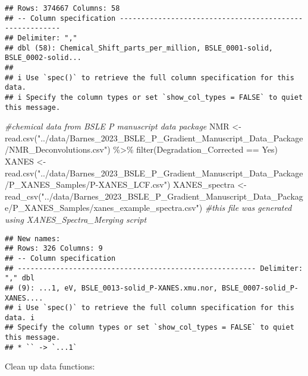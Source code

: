 \documentclass[
]{article}
\newenvironment{Shaded}{\begin{snugshade}}{\end{snugshade}}
\newcommand{\CommentTok}[1]{\textcolor[rgb]{0.56,0.35,0.01}{\textit{#1}}}
\newcommand{\FunctionTok}[1]{\textcolor[rgb]{0.00,0.00,0.00}{#1}}
\newcommand{\NormalTok}[1]{#1}
\newcommand{\OtherTok}[1]{\textcolor[rgb]{0.56,0.35,0.01}{#1}}
\newcommand{\SpecialCharTok}[1]{\textcolor[rgb]{0.00,0.00,0.00}{#1}}
\newcommand{\StringTok}[1]{\textcolor[rgb]{0.31,0.60,0.02}{#1}}
\begin{document}
\begin{verbatim}
## Rows: 374667 Columns: 58
## -- Column specification --------------------------------------------------------
## Delimiter: ","
## dbl (58): Chemical_Shift_parts_per_million, BSLE_0001-solid, BSLE_0002-solid...
## 
## i Use `spec()` to retrieve the full column specification for this data.
## i Specify the column types or set `show_col_types = FALSE` to quiet this message.
\end{verbatim}

\begin{Shaded}
\begin{Highlighting}[]
\CommentTok{\#chemical data from BSLE P manuscript data package}
\NormalTok{NMR }\OtherTok{\textless{}{-}} \FunctionTok{read.csv}\NormalTok{(}\StringTok{"../data/Barnes\_2023\_BSLE\_P\_Gradient\_Manuscript\_Data\_Package/NMR\_Deconvolutions.csv"}\NormalTok{) }\SpecialCharTok{\%\textgreater{}\%}
  \FunctionTok{filter}\NormalTok{(Degradation\_Corrected }\SpecialCharTok{==} \StringTok{\textquotesingle{}Yes\textquotesingle{}}\NormalTok{)}
\NormalTok{XANES }\OtherTok{\textless{}{-}} \FunctionTok{read.csv}\NormalTok{(}\StringTok{"../data/Barnes\_2023\_BSLE\_P\_Gradient\_Manuscript\_Data\_Package/P\_XANES\_Samples/P{-}XANES\_LCF.csv"}\NormalTok{)  }
\NormalTok{XANES\_spectra }\OtherTok{\textless{}{-}} \FunctionTok{read\_csv}\NormalTok{(}\StringTok{"../data/Barnes\_2023\_BSLE\_P\_Gradient\_Manuscript\_Data\_Package/P\_XANES\_Samples/xanes\_example\_spectra.csv"}\NormalTok{) }\CommentTok{\#this file was generated using XANES\_Spectra\_Merging script }
\end{Highlighting}
\end{Shaded}

\begin{verbatim}
## New names:
## Rows: 326 Columns: 9
## -- Column specification
## -------------------------------------------------------- Delimiter: "," dbl
## (9): ...1, eV, BSLE_0013-solid_P-XANES.xmu.nor, BSLE_0007-solid_P-XANES....
## i Use `spec()` to retrieve the full column specification for this data. i
## Specify the column types or set `show_col_types = FALSE` to quiet this message.
## * `` -> `...1`
\end{verbatim}

Clean up data functions:
\end{document}

